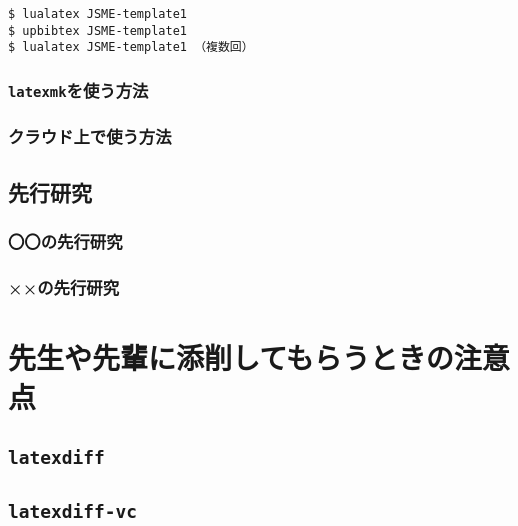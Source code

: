 \documentclass[
    paper=a4paper,      %
    report,             %
    fleqn,              %
    fontsize=12pt,      %
    jafontsize=12pt,    %
    head_space=33mm,    %
    foot_space=30mm,    %
    gutter=25mm,        %
    fore-edge=10mm      %
    ]{jlreq}            %
\begin{document}
\begin{tcolorbox}[enhanced, title=\LuaLaTeX$+$\upBibTeX, drop fuzzy shadow]
\begin{verbatim}
$ lualatex JSME-template1
$ upbibtex JSME-template1
$ lualatex JSME-template1 （複数回）
\end{verbatim}
\end{tcolorbox}


\subsection{\texttt{latexmk}を使う方法}
\label{ssec:latexmk}

\lipsum[1-8]

\subsection{クラウド上で使う方法}
\label{ssec:cloud}


\section{先行研究}
\label{sec:previous}

\lipsum[1-2]

\subsection{〇〇の先行研究}
\label{ssec:marumaru}


\subsection{××の先行研究}
\label{ssec:batsubatsu}

\lipsum[1-4]

\chapter{先生や先輩に添削してもらうときの注意点}
\label{ch:check}

\lipsum[1-10]

\section{\texttt{latexdiff}}
\label{sec:latexdiff}

\lipsum[1-8]


\section{\texttt{latexdiff-vc}}
\label{sec:latexdiff-vc}
\end{document}
